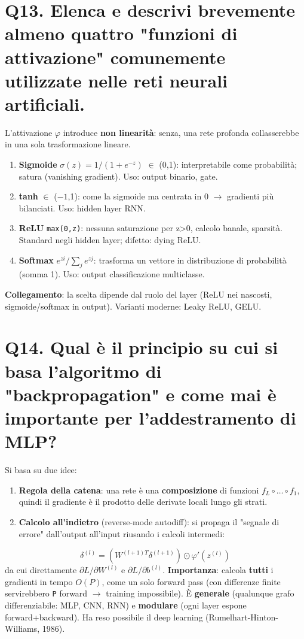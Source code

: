 \documentclass[11pt,a4paper]{article}
\begin{document}
\section*{Q13. Elenca e descrivi brevemente almeno quattro "funzioni di attivazione" comunemente utilizzate nelle reti neurali artificiali.}
L'attivazione $\varphi $ introduce \textbf{non linearità}: senza, una rete profonda collasserebbe in una sola trasformazione lineare.
\begin{enumerate}
\item \textbf{Sigmoide} $\sigma (z)=1/(1+e^{-z})$ $\in $ (0,1): interpretabile come probabilità; satura (vanishing gradient). Uso: output binario, gate.
\item \textbf{tanh} $\in $ ($-1$,1): come la sigmoide ma centrata in 0 $\to $ gradienti più bilanciati. Uso: hidden layer RNN.
\item \textbf{ReLU} \texttt{max(0,z)}: nessuna saturazione per z>0, calcolo banale, sparsità. Standard negli hidden layer; difetto: dying ReLU.
\item \textbf{Softmax} $e^{zi}/\sum _{j}e^{zj}$: trasforma un vettore in distribuzione di probabilità (somma 1). Uso: output classificazione multiclasse.
\end{enumerate}
\textbf{Collegamento}: la scelta dipende dal ruolo del layer (ReLU nei nascosti, sigmoide/softmax in output). Varianti moderne: Leaky ReLU, GELU.
\newpage
\section*{Q14. Qual è il principio su cui si basa l'algoritmo di "backpropagation" e come mai è importante per l'addestramento di MLP?}
Si basa su due idee:
\begin{enumerate}
\item \textbf{Regola della catena}: una rete è una \textbf{composizione} di funzioni $f_L \circ  \dots  \circ  f_1$, quindi il gradiente è il prodotto delle derivate locali lungo gli strati.
\item \textbf{Calcolo all'indietro} (reverse-mode autodiff): si propaga il "segnale di errore" dall'output all'input riusando i calcoli intermedi:
\end{enumerate}
\[ \delta ^{(l)} = (W^{(l+1)T} \delta ^{(l+1)}) \odot  \varphi '(z^{(l)}) \]
da cui direttamente $\partial L/\partial W^{(l)}$ e $\partial L/\partial b^{(l)}$.
\textbf{Importanza}: calcola \textbf{tutti} i gradienti in tempo $O(P)$, come un solo forward pass (con differenze finite servirebbero \texttt{P} forward $\to $ training impossibile). È \textbf{generale} (qualunque grafo differenziabile: MLP, CNN, RNN) e \textbf{modulare} (ogni layer espone forward+backward). Ha reso possibile il deep learning (Rumelhart-Hinton-Williams, 1986).
\newpage
\end{document}
